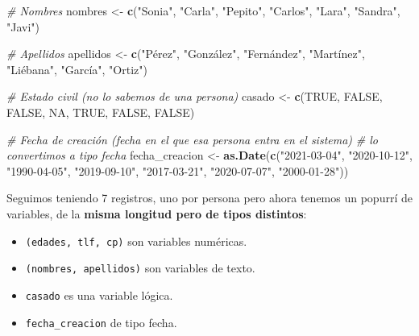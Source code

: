 \documentclass[11pt,]{book}
\newenvironment{Shaded}{\begin{snugshade}}{\end{snugshade}}
\newcommand{\CommentTok}[1]{\textcolor[rgb]{0.37,0.37,0.37}{\textit{#1}}}
\newcommand{\KeywordTok}[1]{\textcolor[rgb]{0.27,0.27,0.27}{\textbf{#1}}}
\newcommand{\NormalTok}[1]{#1}
\newcommand{\OtherTok}[1]{\textcolor[rgb]{0.37,0.37,0.37}{#1}}
\newcommand{\StringTok}[1]{\textcolor[rgb]{0.5,0.5,0.5}{#1}}
\providecommand{\tightlist}{%
  \setlength{\itemsep}{0pt}\setlength{\parskip}{0pt}}
\begin{document}
\begin{Shaded}
\begin{Highlighting}[]
\CommentTok{# Nombres}
\NormalTok{nombres <-}\StringTok{ }\KeywordTok{c}\NormalTok{(}\StringTok{"Sonia"}\NormalTok{, }\StringTok{"Carla"}\NormalTok{, }\StringTok{"Pepito"}\NormalTok{, }\StringTok{"Carlos"}\NormalTok{, }\StringTok{"Lara"}\NormalTok{, }\StringTok{"Sandra"}\NormalTok{, }\StringTok{"Javi"}\NormalTok{)}

\CommentTok{# Apellidos}
\NormalTok{apellidos <-}\StringTok{ }\KeywordTok{c}\NormalTok{(}\StringTok{"Pérez"}\NormalTok{, }\StringTok{"González"}\NormalTok{, }\StringTok{"Fernández"}\NormalTok{, }\StringTok{"Martínez"}\NormalTok{, }\StringTok{"Liébana"}\NormalTok{, }\StringTok{"García"}\NormalTok{, }\StringTok{"Ortiz"}\NormalTok{)}

\CommentTok{# Estado civil (no lo sabemos de una persona)}
\NormalTok{casado <-}\StringTok{ }\KeywordTok{c}\NormalTok{(}\OtherTok{TRUE}\NormalTok{, }\OtherTok{FALSE}\NormalTok{, }\OtherTok{FALSE}\NormalTok{, }\OtherTok{NA}\NormalTok{, }\OtherTok{TRUE}\NormalTok{, }\OtherTok{FALSE}\NormalTok{, }\OtherTok{FALSE}\NormalTok{)}

\CommentTok{# Fecha de creación (fecha en el que esa persona entra en el sistema)}
\CommentTok{# lo convertimos a tipo fecha}
\NormalTok{fecha_creacion <-}\StringTok{ }\KeywordTok{as.Date}\NormalTok{(}\KeywordTok{c}\NormalTok{(}\StringTok{"2021-03-04"}\NormalTok{, }\StringTok{"2020-10-12"}\NormalTok{, }\StringTok{"1990-04-05"}\NormalTok{,}
                            \StringTok{"2019-09-10"}\NormalTok{, }\StringTok{"2017-03-21"}\NormalTok{, }\StringTok{"2020-07-07"}\NormalTok{,}
                            \StringTok{"2000-01-28"}\NormalTok{))}
\end{Highlighting}
\end{Shaded}

Seguimos teniendo 7 registros, uno por persona pero ahora tenemos un popurrí de variables, de la \textbf{misma longitud pero de tipos distintos}:

\begin{itemize}
\tightlist
\item
  \texttt{(edades,\ tlf,\ cp)} son variables numéricas.
\item
  \texttt{(nombres,\ apellidos)} son variables de texto.
\item
  \texttt{casado} es una variable lógica.
\item
  \texttt{fecha\_creacion} de tipo fecha.
\end{itemize}
\end{document}
